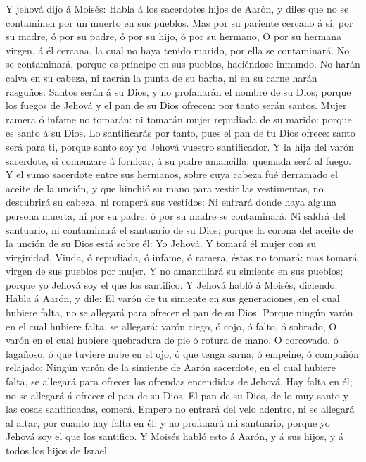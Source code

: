 Y jehová dijo á Moisés: Habla á los sacerdotes hijos de
Aarón, y diles que no se contaminen por un muerto en sus pueblos.
 Mas por su pariente cercano á sí, por su madre, ó por su
padre, ó por su hijo, ó por su hermano,  O por su hermana
virgen, á él cercana, la cual no haya tenido marido, por ella se
contaminará.  No se contaminará, porque es príncipe en sus
pueblos, haciéndose inmundo.  No harán calva en su cabeza,
ni raerán la punta de su barba, ni en su carne harán rasguños.
 Santos serán á su Dios, y no profanarán el nombre de su
Dios; porque los fuegos de Jehová y el pan de su Dios ofrecen: por tanto
serán santos.  Mujer ramera ó infame no tomarán: ni tomarán
mujer repudiada de su marido: porque es santo á su Dios.  Lo
santificarás por tanto, pues el pan de tu Dios ofrece: santo será para
ti, porque santo soy yo Jehová vuestro santificador.  Y la
hija del varón sacerdote, si comenzare á fornicar, á su padre amancilla:
quemada será al fuego.  Y el sumo sacerdote entre sus
hermanos, sobre cuya cabeza fué derramado el aceite de la unción, y que
hinchió su mano para vestir las vestimentas, no descubrirá su cabeza, ni
romperá sus vestidos:  Ni entrará donde haya alguna persona
muerta, ni por su padre, ó por su madre se contaminará.  Ni
saldrá del santuario, ni contaminará el santuario de su Dios; porque la
corona del aceite de la unción de su Dios está sobre él: Yo Jehová.
 Y tomará él mujer con su virginidad.  Viuda,
ó repudiada, ó infame, ó ramera, éstas no tomará: mas tomará virgen de
sus pueblos por mujer.  Y no amancillará su simiente en sus
pueblos; porque yo Jehová soy el que los santifico.  Y
Jehová habló á Moisés, diciendo:  Habla á Aarón, y dile: El
varón de tu simiente en sus generaciones, en el cual hubiere falta, no
se allegará para ofrecer el pan de su Dios.  Porque ningún
varón en el cual hubiere falta, se allegará: varón ciego, ó cojo, ó
falto, ó sobrado,  O varón en el cual hubiere quebradura de
pie ó rotura de mano,  O corcovado, ó lagañoso, ó que
tuviere nube en el ojo, ó que tenga sarna, ó empeine, ó compañón
relajado;  Ningún varón de la simiente de Aarón sacerdote,
en el cual hubiere falta, se allegará para ofrecer las ofrendas
encendidas de Jehová. Hay falta en él; no se allegará á ofrecer el pan
de su Dios.  El pan de su Dios, de lo muy santo y las cosas
santificadas, comerá.  Empero no entrará del velo adentro,
ni se allegará al altar, por cuanto hay falta en él: y no profanará mi
santuario, porque yo Jehová soy el que los santifico.  Y
Moisés habló esto á Aarón, y á sus hijos, y á todos los hijos de Israel.

